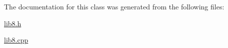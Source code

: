 The documentation for this class was generated from the following files\+:\begin{DoxyCompactItemize}
\item 
\hyperlink{lib8_8h}{lib8.\+h}\item 
\hyperlink{lib8_8cpp}{lib8.\+cpp}\end{DoxyCompactItemize}
